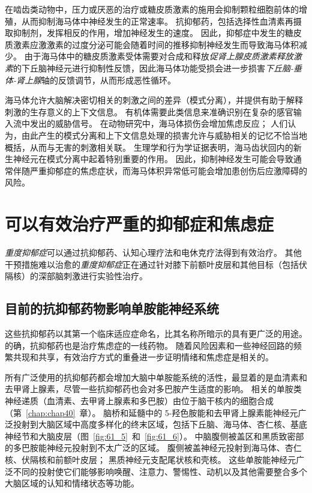 在啮齿类动物中，压力或厌恶的治疗或糖皮质激素的施用会抑制颗粒细胞前体的增殖，从而抑制海马体中神经发生的正常速率。
抗抑郁药，包括选择性血清素再摄取抑制剂，发挥相反的作用，增加神经发生的速度。
因此，抑郁症中发生的糖皮质激素应激激素的过度分泌可能会随着时间的推移抑制神经发生而导致海马体积减少。
由于海马体中的糖皮质激素受体需要对合成和释放\textit{促肾上腺皮质激素释放激素}的下丘脑神经元进行抑制性反馈，因此海马体功能受损会进一步损害\textit{下丘脑-垂体-肾上腺}轴的反馈调节，从而形成恶性循环。


海马体允许大脑解决密切相关的刺激之间的差异（模式分离），并提供有助于解释刺激的生存意义的上下文信息。
有机体需要此类信息来准确识别在复杂的感官输入流中发出的威胁信号。
在动物研究中，海马体损伤会增加焦虑反应；
人们认为，由此产生的模式分离和上下文信息处理的损害允许与威胁相关的记忆不恰当地概括，从而与无害的刺激相关联。
生理学和行为学证据表明，海马齿状回内的新生神经元在模式分离中起着特别重要的作用。
因此，抑制神经发生可能会导致通常伴随严重抑郁症的焦虑症状，而海马体积异常低可能会增加患创伤后应激障碍的风险。



\section{可以有效治疗严重的抑郁症和焦虑症}

\textit{重度抑郁症}可以通过抗抑郁药、认知心理疗法和电休克疗法得到有效治疗。
其他干预措施难以治愈的\textit{重度抑郁症}正在通过针对膝下前额叶皮层和其他目标（包括伏隔核）的深部脑刺激进行实验性治疗。



\subsection{目前的抗抑郁药物影响单胺能神经系统}

这些抗抑郁药以其第一个临床适应症命名，比其名称所暗示的具有更广泛的用途。
的确，抗抑郁药也是治疗焦虑症的一线药物。
随着风险因素和一些神经回路的频繁共现和共享，有效治疗方式的重叠进一步证明情绪和焦虑症是相关的。


所有广泛使用的抗抑郁药都会增加大脑中单胺能系统的活性，最显着的是血清素和去甲肾上腺素，尽管一些抗抑郁药也会对多巴胺产生适度的影响。
相关的单胺类神经递质（血清素、去甲肾上腺素和多巴胺）由位于脑干核内的细胞合成（第~\ref{chap:chap40}~章）。
脑桥和延髓中的 5-羟色胺能和去甲肾上腺素能神经元广泛投射到大脑区域中高度多样化的终末区域，包括下丘脑、海马体、杏仁核、基底神经节和大脑皮层（图~\ref{fig:61_5}~和~\ref{fig:61_6}）。
中脑腹侧被盖区和黑质致密部的多巴胺能神经元投射到不太广泛的区域。
腹侧被盖神经元投射到海马体、杏仁核、伏隔核和前额叶皮层；
黑质神经元支配尾状核和壳核。
这些单胺能神经元广泛不同的投射使它们能够影响唤醒、注意力、警惕性、动机以及其他需要整合多个大脑区域的认知和情绪状态等功能。



